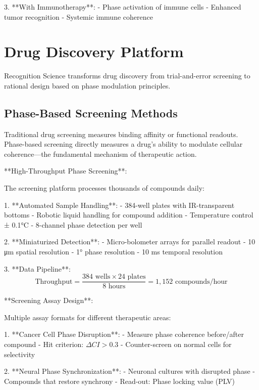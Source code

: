 \documentclass[12pt,a4paper]{report}
\begin{document}
3. **With Immunotherapy**:
   - Phase activation of immune cells
   - Enhanced tumor recognition
   - Systemic immune coherence

\section{Drug Discovery Platform}

Recognition Science transforms drug discovery from trial-and-error screening to rational design based on phase modulation principles.

\subsection{Phase-Based Screening Methods}

Traditional drug screening measures binding affinity or functional readouts. Phase-based screening directly measures a drug's ability to modulate cellular coherence—the fundamental mechanism of therapeutic action.

**High-Throughput Phase Screening**:

The screening platform processes thousands of compounds daily:

1. **Automated Sample Handling**:
   - 384-well plates with IR-transparent bottoms
   - Robotic liquid handling for compound addition
   - Temperature control ± 0.1°C
   - 8-channel phase detection per well

2. **Miniaturized Detection**:
   - Micro-bolometer arrays for parallel readout
   - 10 μm spatial resolution
   - 1° phase resolution
   - 10 ms temporal resolution

3. **Data Pipeline**:
   \begin{equation}
   \text{Throughput} = \frac{384 \text{ wells} \times 24 \text{ plates}}{8 \text{ hours}} = 1,152 \text{ compounds/hour}
   \end{equation}

**Screening Assay Design**:

Multiple assay formats for different therapeutic areas:

1. **Cancer Cell Phase Disruption**:
   - Measure phase coherence before/after compound
   - Hit criterion: $\Delta CI > 0.3$
   - Counter-screen on normal cells for selectivity

2. **Neural Phase Synchronization**:
   - Neuronal cultures with disrupted phase
   - Compounds that restore synchrony
   - Read-out: Phase locking value (PLV)
\end{document}

